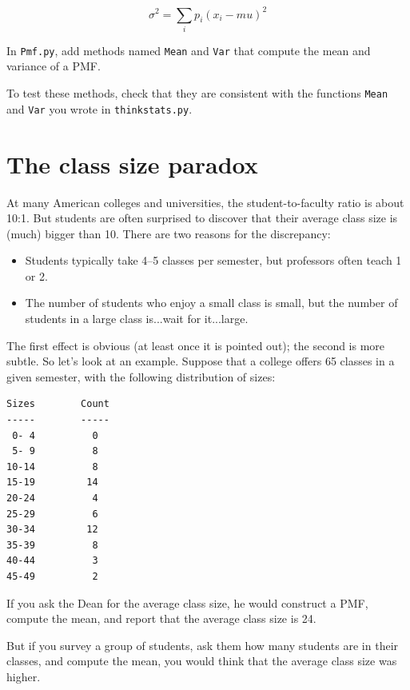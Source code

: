 \documentclass[12pt]{book}
\begin{document}
\[ \sigma^2 = \sum_i p_i (x_i - mu)^2\]

\begin{ex}
In {\tt Pmf.py}, add methods named {\tt Mean} and {\tt Var} that compute
the mean and variance of a PMF.

To test these methods, check that they are consistent with the
functions {\tt Mean} and {\tt Var} you wrote in {\tt thinkstats.py}.
\end{ex}


\section{The class size paradox}

At many American colleges and universities, the student-to-faculty
ratio is about 10:1.  But students are often surprised to discover
that their average class size is (much) bigger than 10.  There
are two reasons for the discrepancy:

\begin{itemize}

\item Students typically take 4--5 classes per semester, but
professors often teach 1 or 2.

\item The number of students who enjoy a small class is small,
but the number of students in a large class is...wait for it...large.

\end{itemize}

The first effect is obvious (at least once it is pointed out);
the second is more subtle.  So let's look at an example.  Suppose
that a college offers 65 classes in a given semester, with the
following distribution of sizes:

\begin{verbatim}
Sizes        Count
-----        -----
 0- 4          0
 5- 9          8
10-14          8
15-19         14
20-24          4
25-29          6
30-34         12
35-39          8
40-44          3
45-49          2
\end{verbatim}

If you ask the Dean for the average class size, he would
construct a PMF, compute the mean, and report that the
average class size is 24.

But if you survey a group of students, ask them how many
students are in their classes, and compute the mean, you would
think that the average class size was higher.
\end{document}
